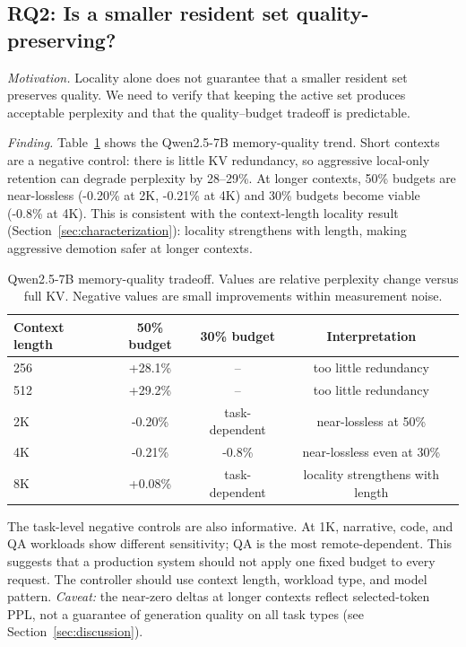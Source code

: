 \documentclass[11pt]{article}
\newcommand{\pct}{\%}
\theoremstyle{definition}
\theoremstyle{plain}
\begin{document}
\subsection{RQ2: Is a smaller resident set quality-preserving?}
\label{sec:rq2}

\emph{Motivation.}  Locality alone does not guarantee that a smaller resident set preserves quality.  We need to verify that keeping the active set produces acceptable perplexity and that the quality--budget tradeoff is predictable.

\emph{Finding.}  Table~\ref{tab:qwen-pareto} shows the Qwen2.5-7B memory-quality trend.  Short contexts are a negative control: there is little KV redundancy, so aggressive local-only retention can degrade perplexity by 28--29\pct{}.  At longer contexts, 50\pct{} budgets are near-lossless (-0.20\pct{} at 2K, -0.21\pct{} at 4K) and 30\pct{} budgets become viable (-0.8\pct{} at 4K).  This is consistent with the context-length locality result (Section~\ref{sec:characterization}): locality strengthens with length, making aggressive demotion safer at longer contexts.

\begin{table}[t]
\centering
\caption{Qwen2.5-7B memory-quality tradeoff.  Values are relative perplexity change versus full KV.  Negative values are small improvements within measurement noise.}
\label{tab:qwen-pareto}
\small
\begin{tabular}{lccc}
\toprule
Context length & 50\pct{} budget & 30\pct{} budget & Interpretation \\
\midrule
256 & +28.1\pct{} & -- & too little redundancy \\
512 & +29.2\pct{} & -- & too little redundancy \\
2K & -0.20\pct{} & task-dependent & near-lossless at 50\pct{} \\
4K & -0.21\pct{} & -0.8\pct{} & near-lossless even at 30\pct{} \\
8K & +0.08\pct{} & task-dependent & locality strengthens with length \\
\bottomrule
\end{tabular}
\end{table}

The task-level negative controls are also informative.  At 1K, narrative, code, and QA workloads show different sensitivity; QA is the most remote-dependent.  This suggests that a production system should not apply one fixed budget to every request.  The controller should use context length, workload type, and model pattern.  \emph{Caveat:} the near-zero deltas at longer contexts reflect selected-token PPL, not a guarantee of generation quality on all task types (see Section~\ref{sec:discussion}).
\end{document}

